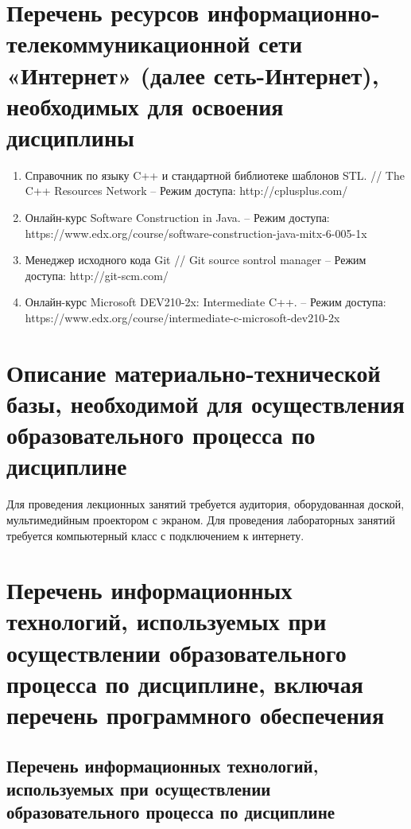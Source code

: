 \documentclass[a4paper,12pt]{article}
\begin{document}
\section{Перечень ресурсов информационно-телекоммуникационной сети «Интернет» (далее сеть-Интернет), необходимых для освоения дисциплины}
\begin{enumerate}
  
  \item Справочник по языку C++ и стандартной библиотеке шаблонов STL. // The C++ Resources Network -- Режим доступа: http://cplusplus.com/ 
  
  \item Онлайн-курс Software Construction in Java. -- Режим доступа: \\https://www.edx.org/course/software-construction-java-mitx-6-005-1x 
  
  \item Менеджер исходного кода Git // Git source sontrol manager -- Режим доступа: http://git-scm.com/ 
  
  \item Онлайн-курс Microsoft DEV210-2x: Intermediate C++. -- Режим доступа: \\https://www.edx.org/course/intermediate-c-microsoft-dev210-2x 
  
\end{enumerate}


\newpage
\section{Описание материально-технической базы, необходимой для осуществления образовательного процесса по дисциплине}
  
  
       Для проведения лекционных занятий требуется аудитория, оборудованная доской,  мультимедийным проектором с экраном. 
       Для проведения лабораторных занятий требуется компьютерный класс с подключением к интернету.
  
  


\section{Перечень информационных технологий, используемых при осуществлении образовательного процесса по дисциплине, включая перечень программного обеспечения
}

\subsection{Перечень информационных технологий, используемых при осуществлении образовательного процесса по дисциплине}
\end{document}
